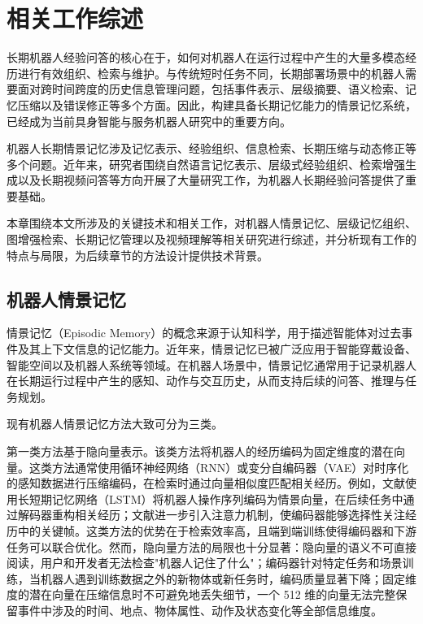 
\chapter{相关工作综述}

长期机器人经验问答的核心在于，如何对机器人在运行过程中产生的大量多模态经历进行有效组织、检索与维护。与传统短时任务不同，长期部署场景中的机器人需要面对跨时间跨度的历史信息管理问题，包括事件表示、层级摘要、语义检索、记忆压缩以及错误修正等多个方面。因此，构建具备长期记忆能力的情景记忆系统，已经成为当前具身智能与服务机器人研究中的重要方向。

机器人长期情景记忆涉及记忆表示、经验组织、信息检索、长期压缩与动态修正等多个问题。近年来，研究者围绕自然语言记忆表示、层级式经验组织、检索增强生成以及长期视频问答等方向开展了大量研究工作，为机器人长期经验问答提供了重要基础。

本章围绕本文所涉及的关键技术和相关工作，对机器人情景记忆、层级记忆组织、图增强检索、长期记忆管理以及视频理解等相关研究进行综述，并分析现有工作的特点与局限，为后续章节的方法设计提供技术背景。

\section{机器人情景记忆}

情景记忆（Episodic Memory）的概念来源于认知科学\cite{tulving1983elements,tulving1972episodic,squire2011cognitive,conway2009episodic}，用于描述智能体对过去事件及其上下文信息的记忆能力。近年来，情景记忆已被广泛应用于智能穿戴设备、智能空间以及机器人系统等领域。在机器人场景中，情景记忆通常用于记录机器人在长期运行过程中产生的感知、动作与交互历史，从而支持后续的问答、推理与任务规划。

现有机器人情景记忆方法大致可分为三类。

第一类方法基于隐向量表示。该类方法将机器人的经历编码为固定维度的潜在向量。这类方法通常使用循环神经网络（RNN）或变分自编码器（VAE）对时序化的感知数据进行压缩编码，在检索时通过向量相似度匹配相关经历\cite{elman1990rnn,kingma2014vae,hochreiter1997lstm,bahdanau2015attention}。例如，文献\cite{hochreiter1997lstm}使用长短期记忆网络（LSTM）将机器人操作序列编码为情景向量，在后续任务中通过解码器重构相关经历；文献\cite{bahdanau2015attention}进一步引入注意力机制，使编码器能够选择性关注经历中的关键帧。这类方法的优势在于检索效率高，且端到端训练使得编码器和下游任务可以联合优化。然而，隐向量方法的局限也十分显著：隐向量的语义不可直接阅读，用户和开发者无法检查"机器人记住了什么"；编码器针对特定任务和场景训练，当机器人遇到训练数据之外的新物体或新任务时，编码质量显著下降；固定维度的潜在向量在压缩信息时不可避免地丢失细节，一个 512 维的向量无法完整保留事件中涉及的时间、地点、物体属性、动作及状态变化等全部信息维度。

